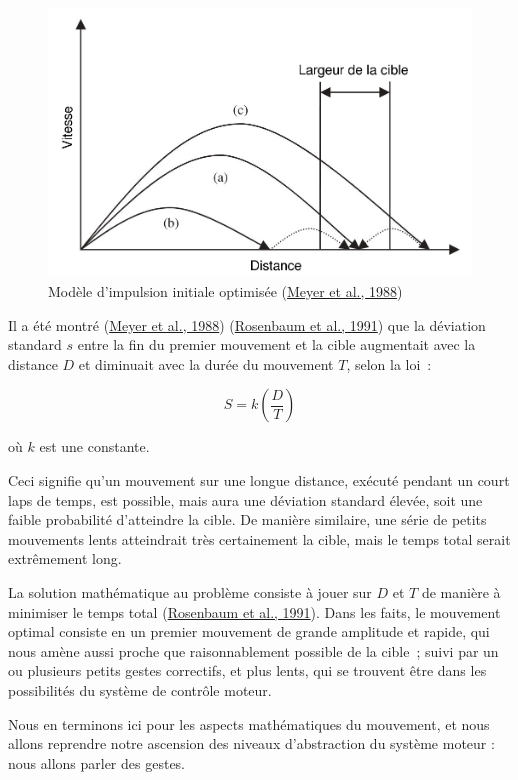 \documentclass[
]{book}
\begin{document}
\begin{figure}
\centering
\includegraphics{img/meyer.png}
\caption{\label{fig:impulsion}Modèle d'impulsion
initiale optimisée (\protect\hyperlink{ref-meyer1988optimality}{Meyer et al., 1988})}
\end{figure}

Il a été montré (\protect\hyperlink{ref-meyer1988optimality}{Meyer et al., 1988}) (\protect\hyperlink{ref-rosenbaum1991optimal}{Rosenbaum et al., 1991}) que la
déviation standard \(s\) entre la fin du premier
mouvement et la cible augmentait avec la distance \(D\) et diminuait avec la
durée du mouvement \(T\), selon la loi~:

\[ S=k\left(\frac{D}{T}\right)\]

où \(k\) est une constante.

Ceci signifie qu'un mouvement sur une longue distance, exécuté pendant un
court laps de temps, est possible, mais aura une déviation standard élevée,
soit une faible probabilité d'atteindre la cible. De manière similaire, une
série de petits mouvements lents atteindrait très certainement la cible, mais
le temps total serait extrêmement long.

La solution mathématique au problème consiste à jouer sur \(D\) et \(T\) de manière
à minimiser le temps total (\protect\hyperlink{ref-rosenbaum1991optimal}{Rosenbaum et al., 1991}). Dans
les faits, le mouvement optimal consiste en un premier mouvement de grande
amplitude et rapide, qui nous amène aussi proche que raisonnablement possible
de la cible~; suivi par un ou plusieurs petits gestes correctifs, et plus
lents, qui se trouvent être dans les possibilités du système de contrôle
moteur.

Nous en terminons ici pour les aspects mathématiques du mouvement, et nous
allons reprendre notre ascension des niveaux d'abstraction du système moteur
: nous allons parler des gestes.
\end{document}
